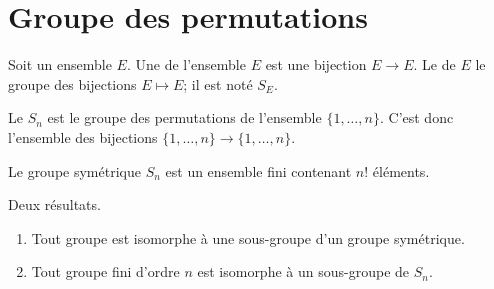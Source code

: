 
\section{Groupe des permutations}

\begin{definition}      \label{DEFooJNPIooMuzIXd}
    Soit un ensemble \( E\). Une  de l'ensemble \( E\) est une bijection \( E\to E\). Le  de \( E\) le groupe des bijections \( E\mapsto E\); il est noté \( S_E\).

    Le  \( S_n\) est le groupe des permutations de l'ensemble \( \{ 1,\ldots,n \}\). C'est donc l'ensemble des bijections \( \{ 1,\ldots, n \}\to\{ 1,\ldots, n \}\).
\end{definition}

\begin{lemma}        \label{LEMooSGWKooKFIDyT}
    Le groupe symétrique \( S_n\) est un ensemble fini contenant \( n!\) éléments.
\end{lemma}

\begin{lemma}        \label{LEMooUPBOooWbwMTx}
    Deux résultats.
    \begin{enumerate}
        \item
            Tout groupe est isomorphe à une sous-groupe d'un groupe symétrique.
        \item
            Tout groupe fini d'ordre \( n\) est isomorphe à un sous-groupe de \( S_n\).
    \end{enumerate}
\end{lemma}

